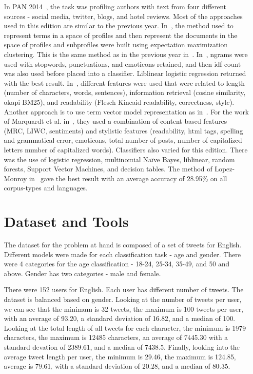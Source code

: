 \documentclass[a4paper]{llncs}
\begin{document}
In PAN 2014~\cite{rangel2014overview}, the task was profiling authors with text from four different sources - social media, twitter, blogs, and hotel reviews. Most of the approaches used in this edition are similar to the previous year. In~\cite{lopezusing}, the method used to represent terms in a space of profiles and then represent the documents in the space of profiles and subprofiles were built using expectation maximization clustering. This is the same method as in the previous year in~\cite{lopez2013inaoe}. In~\cite{maharjansimple}, ngrams were used with stopwords, punctuations, and emoticons retained, and then idf count was also used before placed into a classifier. Liblinear logistic regression returned with the best result. In~\cite{weren6exploring}, different features were used that were related to length (number of characters, words, sentences), information retrieval (cosine similarity, okapi BM25), and readability (Flesch-Kincaid readability, correctness, style). Another approach is to use term vector model representation as in~\cite{villenadaedalus}. For the work of Marquardt et al. in~\cite{marquardt2014age}, they used a combination of content-based features (MRC, LIWC, sentiments) and stylistic features (readability, html tags, spelling and grammatical error, emoticons, total number of posts, number of capitalized letters number of capitalized words). Classifiers also varied for this edition. There was the use of logistic regression, multinomial Naïve Bayes, liblinear, random forests, Support Vector Machines, and decision tables. The method of Lopez-Monroy in~\cite{lopezusing} gave the best result with an average accuracy of 28.95\% on all corpus-types and languages. 

\section{Dataset and Tools}
The dataset for the problem at hand is composed of a set of tweets for English. Different models were made for each classification task - age and gender. There were 4 categories for the age classification - 18-24, 25-34, 35-49, and 50 and above. Gender has two categories - male and female. 

There were 152 users for English. Each user has different number of tweets. The dataset is balanced based on gender. Looking at the number of tweets per user, we can see that the minimum is 32 tweets, the maximum is 100 tweets per user, with an average of 93.20, a standard deviation of 16.82, and a median of 100. Looking at the total length of  all tweets for each character, the minimum is 1979 characters, the maximum is 12485 characters, an average of 7445.30 with a standard devation of 2389.61, and a median of 7438.5. Finally, looking into the average tweet length per user, the minimum is 29.46, the maximum is 124.85, average is 79.61, with a standard deviation of 20.28, and a median of 80.35.   
\end{document}

